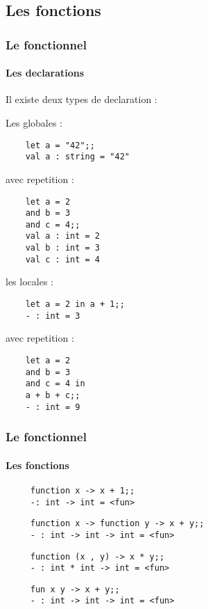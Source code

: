 \subsection{Les fonctions} %
\begin{frame}[fragile]
      \frametitle{Le fonctionnel}
      \framesubtitle{Les declarations}
      Il existe deux types de declaration :
     \begin{minipage}[t]{5cm}
	Les globales :\\
	\begin{lstlisting}
	let a = "42";;
	val a : string = "42"
	\end{lstlisting}
	avec repetition :
	\begin{lstlisting}
	let a = 2
	and b = 3
	and c = 4;;
	val a : int = 2
	val b : int = 3
	val c : int = 4
	\end{lstlisting}
      \end{minipage}
      \begin{minipage}[t]{5cm}
	les locales :\\
	\begin{lstlisting}
	let a = 2 in a + 1;;
	- : int = 3
	\end{lstlisting}
	avec repetition :
	\begin{lstlisting}
	let a = 2
	and b = 3
	and c = 4 in
	a + b + c;;
	- : int = 9
	\end{lstlisting}
      \end{minipage}
\end{frame}

\begin{frame}[fragile]
      \frametitle{Le fonctionnel}
      \framesubtitle{Les fonctions}
      \begin{minipage}[t]{7cm}
	\begin{center}
	\begin{itemize}
    \begin{lstlisting}
     function x -> x + 1;;
     -: int -> int = <fun>
    \end{lstlisting}
    \begin{lstlisting}
     function x -> function y -> x + y;;
     - : int -> int -> int = <fun>
    \end{lstlisting}
    \begin{lstlisting}
     function (x , y) -> x * y;;
     - : int * int -> int = <fun>
    \end{lstlisting}
   \begin{lstlisting}
     fun x y -> x + y;;
     - : int -> int -> int = <fun>
    \end{lstlisting}
  \end{itemize}
  \end{center}
  \end{minipage}
\end{frame}

